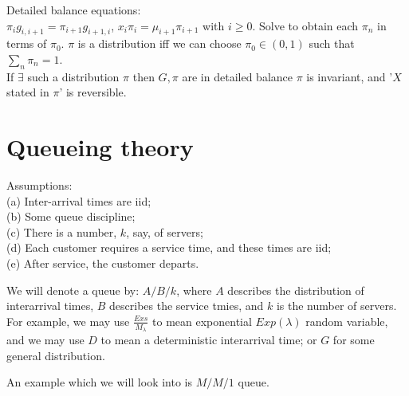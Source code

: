 \documentclass[a4paper]{article}
\begin{document}
Detailed balance equations:\\
$\pi_i g_{i,i+1} = \pi_{i+1} g_{i+1,i}$, $x_i \pi_i = \mu_{i+1} \pi_{i+1}$ with $i \geq 0$. Solve to obtain each $\pi_n$ in terms of $\pi_0$. $\pi$ is a distribution iff we can choose $\pi_0 \in (0,1)$ such that $\sum_n \pi_n = 1$.\\
If $\exists$ such a distribution $\pi$ then $G,\pi$ are in detailed balance $\pi$ is invariant, and '$X$ stated in $\pi$' is reversible.

\newpage

\section{Queueing theory}
Assumptions:\\
(a) Inter-arrival times are iid;\\
(b) Some queue discipline;\\
(c) There is a number, $k$, say, of servers;\\
(d) Each customer requires a service time, and these times are iid;\\
(e) After service, the customer departs.

We will denote a queue by: $A/B/k$, where $A$ describes the distribution of interarrival times, $B$ describes the service tmies, and $k$ is the number of servers. For example, we may use $\frac{Exs}{M_\lambda}$ to mean exponential $Exp(\lambda)$ random variable, and we may use $D$ to mean a deterministic interarrival time; or $G$ for some general distribution.

An example which we will look into is $M/M/1$ queue.

\end{document}
